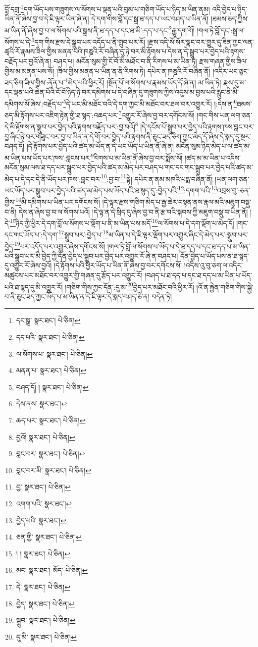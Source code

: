བློ་དགྲ་\footnote{དང་སྒྲ་  སྣར་ཐང་།  པེ་ཅིན། }དག་ཡོད་པས་གཟུགས་ལ་སོགས་པ་ལྡན་པའི་བུམ་པ་གཅིག་ཡོད་པ་ཉིད་མ་ཡིན་ནམ། འདི་བྱེད་པ་ཉིད་ཡིན་ནོ་ཞེས་བྱ་བ་དེ་ཇི་ལྟར་ཡིན་ཞེ་ན། དེ་དག་གིས་བློ་དང་སྒྲ་ཐ་དད་པ་ཡང་བཤད་པ་ཡིན་ནོ། །ཐམས་ཅད་ཀྱིས་མ་ཡིན་ནོ་ཞེས་བྱ་བ་ལ་སོགས་པའི་སྒྲས་ནི་ཐ་དད་པ་དང་ཐ་མི་:དད་པ་དང་\footnote{དད་པའི་  སྣར་ཐང་།  པེ་ཅིན། }རྒྱུ་དག་གོ། །གལ་ཏེ་བློ་དང་:སྒྲ་ལ་སོགས་པ་དེ་\footnote{ལ་སོགས་པ་  སྣར་ཐང་།  པེ་ཅིན། }དག་གིས་རྫས་དེ་སྒྲུབ་པར་འདོད་པ་ནི་གྲུབ་པར་རོ། །རྫས་འདི་སོ་སོར་སྣང་བར་གྱུར་དུ་ཟིན་ཀྱང་ལན་ཚྭའི་རོ་རྣམས་ཟིལ་གྱིས་མནན་པའི་ཁཎྜའི་རོ་བཞིན་དུ་ཉེ་བར་མི་རྟོགས་པ་དེས་ན་དེ་སྒྲུབ་པར་བྱེད་པའི་རྟགས་བརྗོད་པར་བྱའོ་ཞེ་ན། བཤད་པ། མངོན་སུམ་གྱི་ངོ་བོ་མི་མཐོང་བ་ནི་རིགས་པ་མ་ཡིན་ཏེ། རྫས་གཞན་གྱིས་ཟིལ་གྱིས་མ་མནན་པས་སོ། །ཟིལ་གྱིས་མནན་པ་ཡིན་ན་ནི་རིགས་ཏེ། དཔེར་ན་ཁཎྜའི་རོ་བཞིན་ནོ། །འདིར་ཡང་ཅུང་ཟད་ཅིག་ཟིལ་གྱིས་:ནོན་པ་\footnote{མནན་པ་  སྣར་ཐང་།  པེ་ཅིན། }མེད་པའི་ཕྱིར་རོ། །སྔོན་པོ་ལ་སོགས་པ་རྣམས་ཡོད་དོ་ཞེ་ན། མ་ཡིན་ཏེ། རྫས་དུ་མ་དང་ལྡན་པའི་ཆེན་པོའི་ངོ་བོ་ཉིད་ཉེ་བར་དམིགས་པ་དེ་བཞིན་དུ་གཟུགས་ཀྱིས་འདུས་མ་བྱས་པའི་རླུང་ནི་མི་དམིགས་སོ་ཞེས་:བརྗོད་པ་\footnote{བཤད་དོ། །  སྣར་ཐང་།  པེ་ཅིན། }དེ་ཡང་མི་མཐོང་བའི་དེ་དག་ཀྱང་མི་མཐོང་བར་ཐལ་བར་འགྱུར་རོ། །:དེས་ན་\footnote{དེས་ནས་  སྣར་ཐང་། }ཐམས་ཅད་མི་རྟོགས་པར་འཇིག་རྟེན་གྱི་ཐ་སྙད་:འཆད་པར་\footnote{ཆད་པར་  སྣར་ཐང་།  པེ་ཅིན། }འགྱུར་རོ་ཞེས་བྱ་བར་དགོངས་སོ། །གང་གིས་ཡན་ལག་ཅན་དེ་མི་རྟོགས་ན་སྒྲུབ་པར་བྱེད་པའི་རྟགས་བརྗོད་པར་:བྱ་བའོ།\footnote{བྱའོ།  སྣར་ཐང་།  པེ་ཅིན། } །དེ་དངོས་པོ་སྒྲུབ་པར་བྱེད་པའི་རྟགས་ཁས་བླང་བར་བྱ་ཞིང་ཉེ་བར་གཟུང་བར་བྱ་བ་ཡིན་ན་དེ་གོ་བར་བྱེད་པའི་རྟགས་ནི་ཅུང་ཟད་ཅིག་ཀྱང་མེད་དོ་ཞེས་དེ་སྐད་དུ་སྔར་བཤད་དོ། །དེ་རྟོགས་པར་བྱེད་པའི་ཚད་མ་ཡོད་ན་དེ་ཡང་ཡོད་པ་ཡིན་ནོ་ཞེ་ན། མངོན་སུམ་ཉིད་མེད་པ་ལ་ཚད་མ་མ་ཡིན་པས་ཡོད་པར་ཁས་:བླངས་པར་\footnote{བླང་བར་  སྣར་ཐང་།  པེ་ཅིན། }རིགས་པ་མ་ཡིན་ནོ་ཞེས་བྱ་བར་སྨོས་སོ། །ཚད་མ་མ་ཡིན་པ་འདིས་མངོན་སུམ་ལས་ཐ་དད་པར་སྒྲུབ་པར་བྱེད་པའི་ཚད་མ་མེད་པར་བཤད་པ་གང་དང་གང་སྒྲུབ་པར་བྱེད་པའི་ཚད་མ་མེད་པ་དེ་དང་དེ་ནི་ཡོད་པར་ཁས་:བླང་བར་\footnote{བླང་བར་མི་  སྣར་ཐང་།  པེ་ཅིན། }:བྱ་བ་\footnote{བྱ་  སྣར་ཐང་།  པེ་ཅིན། }སྟེ། དཔེར་ན་ནམ་མཁའི་པདྨ་བཞིན་ནོ། །ཡན་ལག་ཅན་ཡང་ཡོད་པར་སྒྲུབ་པར་བྱེད་པའི་ཚད་མ་མེད་པས་ཡོད་པའི་ཐ་སྙད་དུ་:བྱེད་པའི་\footnote{འགག་པའི་  སྣར་ཐང་། }:དགག་པའི་\footnote{བྱེད་པའི་  སྣར་ཐང་། }འབྲས་བུ་:ཅན་གྱིས་\footnote{ཅན་གྱི་  སྣར་ཐང་།  པེ་ཅིན། }མི་དམིགས་པ་ཡིན་པར་དགོངས་སོ། །དེ་ལྟར་རྫས་གཅིག་མེད་པ་རྒྱ་ཆེར་བསྟན་ནས་རྣལ་མའི་མཇུག་བསྡུ་བ་ནི། དེས་ན་ཞེས་བྱ་བ་ལ་སོགས་པའོ། །དེ་ལྟ་ན་དེ་སྲིད་དུ་ཞེས་བྱ་བ་ནི་རྩ་བའི་སྐབས་ཀྱི་མཇུག་བསྡུ་བ་ཡིན་ནོ། །དེ་\footnote{། །  སྣར་ཐང་།  པེ་ཅིན། }ཉིད་ཀྱི་ཕྱིར་དེ་དག་བློ་ལ་སོགས་པ་ལྡོག་པ་ནི་མ་ཡིན་པས་མདོ་\footnote{མང་  སྣར་ཐང་། མོད་  པེ་ཅིན། }ལ་སོགས་པ་དེ་དག་ལྡོག་པ་མེད་དོ། །གང་དང་གང་ཡོད་པ་:དེ་དག་\footnote{དེ་  སྣར་ཐང་།  པེ་ཅིན། }སྒྲུབ་པར་:བྱེད་པ་\footnote{བྱེད་  སྣར་ཐང་།  པེ་ཅིན། }མ་ཡིན་པ་དེ་ཇི་ལྟར་ལྡོག་པར་འགྱུར་ཞིང་དེ་མེད་པར་:སྒྲུབ་པར་བྱེད་\footnote{སྒྲུབ་  སྣར་ཐང་།  པེ་ཅིན། }པར་འདོད་པར་འགྱུར་ཞེས་དགོངས་སོ། །གལ་ཏེ་བློ་ལ་སོགས་པ་ཡོད་པ་དེ་ཐ་དད་པ་དང་ཐ་དད་པ་མ་ཡིན་པའི་སྒྲུབ་པར་མི་བྱེད་ཀྱི་དོན་བྱེད་པ་སྒྲུབ་པར་བྱེད་པར་འགྱུར་རོ་ཞེ་ན་བཤད་པ། དོན་བྱེད་པ་ཡོད་པས་ན་ཐ་སྙད་དུ་འགྱུར་རོ་ཞེས་བྱའོ། །དེ་རྟོགས་པའི་ཕྱིར་ཡོད་པ་ཡིན་ནོ་ཞེས་བྱ་བར་དགོངས་སོ། །འདིས་འུ་བུ་ཅག་ལ་འདིར་མཚུངས་པར་མཐོང་བར་འགྱུར་གྱི་གཞན་དུ་རྩོད་པར་འགྱུར་རོ། །བཤད་པ་ཐ་དད་པ་དང་ཐ་དད་པ་མ་ཡིན་པ་ཡོད་པའི་ཐ་སྙད་དུ་མི་འགྱུར་རོ། །གཅིག་གིས་ཀྱང་དོན་:དུ་མ་\footnote{དུ་མི་  སྣར་ཐང་།  པེ་ཅིན། }བྱེད་པར་མཐོང་བའི་ཕྱིར་རོ། །འོ་ན་རྐྱེན་གཅིག་གིས་སྐྱེ་བ་ནི་ཅུང་ཟད་ཀྱང་ཡོད་པ་མ་ཡིན་ན་དེ་ཇི་ལྟར་དེ་སྐད་བཤད་ཅེ་ན། བདེན་ཏེ། 